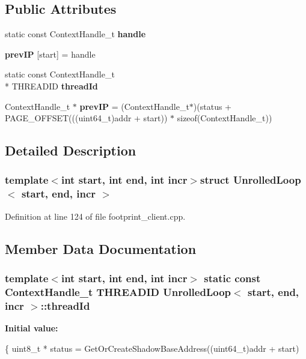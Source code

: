 \subsection*{Public Attributes}
\begin{DoxyCompactItemize}
\item 
\hypertarget{structUnrolledLoop_aabfc9c04a0585b0e114d0e7d032499dc}{static const Context\-Handle\-\_\-t {\bfseries handle}}\label{structUnrolledLoop_aabfc9c04a0585b0e114d0e7d032499dc}

\item 
\hypertarget{structUnrolledLoop_a85358a3b4ab29cb928d41a4c5c9702d6}{{\bfseries prev\-I\-P} \mbox{[}start\mbox{]} = handle}\label{structUnrolledLoop_a85358a3b4ab29cb928d41a4c5c9702d6}

\item 
static const Context\-Handle\-\_\-t \\*
T\-H\-R\-E\-A\-D\-I\-D {\bfseries thread\-Id}
\item 
\hypertarget{structUnrolledLoop_a67d41c3f1f3fbbfc8c78e648b4928fee}{Context\-Handle\-\_\-t $\ast$ {\bfseries prev\-I\-P} = (Context\-Handle\-\_\-t$\ast$)(status + P\-A\-G\-E\-\_\-\-O\-F\-F\-S\-E\-T(((uint64\-\_\-t)addr + start)) $\ast$ sizeof(Context\-Handle\-\_\-t))}\label{structUnrolledLoop_a67d41c3f1f3fbbfc8c78e648b4928fee}

\end{DoxyCompactItemize}


\subsection{Detailed Description}
\subsubsection*{template$<$int start, int end, int incr$>$struct Unrolled\-Loop$<$ start, end, incr $>$}



Definition at line 124 of file footprint\-\_\-client.\-cpp.



\subsection{Member Data Documentation}
\hypertarget{structUnrolledLoop_ac5426756853c9faf9db3eeaac626b08e}{
\subsubsection[{thread\-Id}]{\setlength{\rightskip}{0pt plus 5cm}template$<$int start, int end, int incr$>$ static const Context\-Handle\-\_\-t T\-H\-R\-E\-A\-D\-I\-D {\bf Unrolled\-Loop}$<$ start, end, incr $>$\-::thread\-Id}}\label{structUnrolledLoop_ac5426756853c9faf9db3eeaac626b08e}
{\bfseries Initial value\-:}
\begin{DoxyCode}
\{
        uint8\_t * status = GetOrCreateShadowBaseAddress((uint64\_t)addr + start)
\end{DoxyCode}


